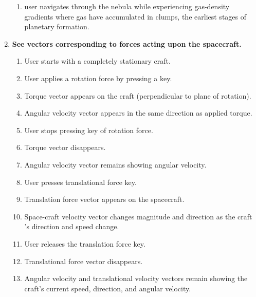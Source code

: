 \begin{enumerate}
\begin{enumerate}
  \item user navigates through the nebula while experiencing gas-density gradients where gas have accumulated in clumps, the earliest stages of planetary formation.

\end{enumerate}

\item\textbf{See vectors corresponding to forces acting upon the spacecraft.}
\begin{enumerate}

  \item User starts with a completely stationary craft.

  \item User applies a rotation force by pressing a key.

  \item Torque vector appears on the craft (perpendicular to plane of rotation).
  
  \item Angular velocity vector appears in the same direction as applied torque.

  \item User stops pressing key of rotation force.

  \item Torque vector disappears.

  \item Angular velocity vector remains showing angular velocity.

  \item User presses translational force key.

  \item Translation force vector appears on the spacecraft.

  \item Space-craft velocity vector changes magnitude and direction as the craft
's direction and speed change.

  \item User releases the translation force key.

  \item Translational force vector disappears.

  \item Angular velocity and translational velocity vectors remain showing the craft's current speed, direction, and angular velocity.

\end{enumerate}

\end{enumerate}

